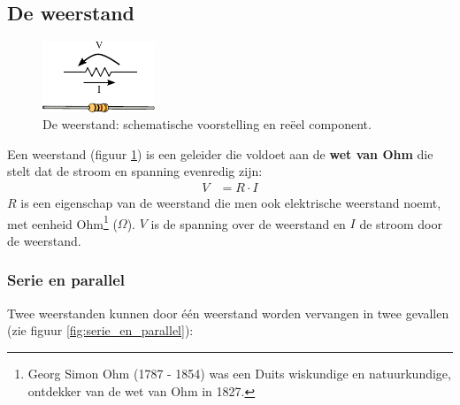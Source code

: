 \documentclass{article}
\begin{document}

		\subsection{De weerstand}
			\begin{figure}[htbp]
				\centering
				\includegraphics[width=0.3\textwidth]{weerstand}
				\caption{De weerstand: schematische voorstelling en re\"eel component.}
				\label{fig:weerstand}
			\end{figure}
			 Een weerstand (figuur \ref{fig:weerstand}) is een geleider die voldoet aan de \textbf{wet van Ohm} die stelt dat de stroom en spanning evenredig zijn: 
			\begin{align}
				V &= R \cdot I
			\end{align} 
			$R$ is een eigenschap van de weerstand die men ook elektrische weerstand noemt, met eenheid Ohm\footnote{Georg Simon Ohm (1787 - 1854) was een Duits wiskundige en natuurkundige, ontdekker van de wet van Ohm in 1827.} ($\Omega$). $V$ is de spanning over de weerstand en $I$ de stroom door de weerstand.



		\subsubsection{Serie en parallel}
			\label{sssec:serie_en_parallel}
			Twee weerstanden kunnen door \'e\'en  weerstand worden vervangen in twee gevallen (zie figuur \ref{fig:serie_en_parallel}):
\end{document}
